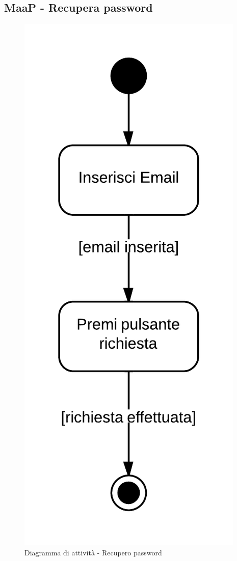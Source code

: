 \subsection{MaaP - Recupera password}

\begin{figure}[H]
\centering
\includegraphics[scale=0.2]{uml/MaaP - Recupera password.png}
\caption{Diagramma di attività - Recupero password}
\end{figure}

